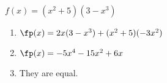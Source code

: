 {$f(x)= (x^2+5)(3-x^3)$
}
{\begin{enumerate}
\item		$\fp(x) = 2x(3-x^3)+(x^2+5)(-3x^2)$
\item		$\fp(x) = -5x^4-15x^2+6x$
\item		They are equal.
\end{enumerate}
}
